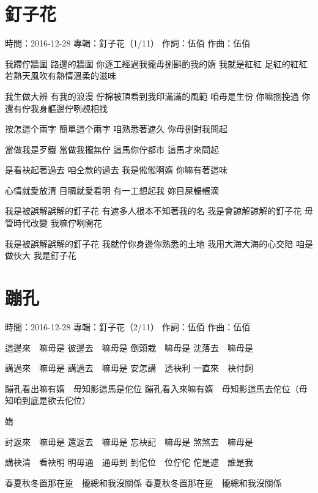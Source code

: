 \documentclass[UTF8,a4paper,oneside,twocolumn,12pt]{ctexbook}
\newcommand{\infopair}[2]{\textbullet #1：#2}
\newcommand{\zc}[1][伍佰]{\infopair{作詞}{#1}}
\newcommand{\zq}[1][伍佰]{\infopair{作曲}{#1}}
\newcommand{\zj}[1]{\infopair{專輯}{#1}}
\newcommand{\sj}[1]{\infopair{時間}{#1}}
\newenvironment{info}{\begin{flushleft}\kaishu
	}
	{\end{flushleft}\normalsize\yahei\par}
\newenvironment{lyric}{
	}
{}
\begin{document}
\section{釘子花}
\begin{info}
	\sj{2016-12-28}
	\zj{釘子花（1/11）}
	\zc
	\zq
\end{info}
\begin{lyric}
	我蹛佇牆圍 路邊的牆圍
	你逐工經過我攏毋捌斟酌我的媠
	我就是紅紅 足紅的紅紅
	若熱天風吹有熱情溫柔的滋味

	我生做大辨 有我的浪漫
	佇棉被頂看到我印滿滿的風範
	咱毋是生份 你嘛捌挽過
	你還有佇我身軀邊佇咧覕相找

	按怎這个兩字 簡單這个兩字
	咱熟悉著遮久 你毋捌對我問起

	當做我是歹鐵 當做我攏無佇
	這馬你佇都市 這馬才來問起

	是看袂起著過去 咱仝款的過去
	我是倯倯啊媠 你嘛有著這味

	心情就愛放清 目睭就愛看明
	有一工想起我 妳目屎輾輾滴

	我是被誤解誤解的釘子花
	有遮多人根本不知著我的名
	我是會諒解諒解的釘子花
	毋管時代改變 我嘛佇咧開花

	我是被誤解誤解的釘子花
	我就佇你身邊你熟悉的土地
	我用大海大海的心交陪
	咱是做伙大 我是釘子花
\end{lyric}

\section{蹦孔}
\begin{info}
	\sj{2016-12-28}
	\zj{釘子花（2/11）}
	\zc
	\zq
\end{info}
\begin{lyric}
	這邊來　嘛毋是
	彼邊去　嘛毋是
	倒頭栽　嘛毋是
	沈落去　嘛毋是

	講過來　嘛毋是
	講過去　嘛毋是
	安怎講　透袂利
	一直來　袂付飼

	蹦孔看出嘛有媠　毋知影這馬是佗位
	蹦孔看入來嘛有媠　毋知影這馬去佗位（毋知咱到底是欲去佗位）

	媠

	討返來　嘛毋是
	還返去　嘛毋是
	忘袂記　嘛毋是
	煞煞去　嘛毋是

	講袂清　看袂明
	明毋通　通毋到
	到佗位　位佇佗
	佗是遮　誰是我

	春夏秋冬置那在踅　攏總和我沒關係
	春夏秋冬置那在踅　攏總和我沒關係
\end{lyric}
\end{document}
